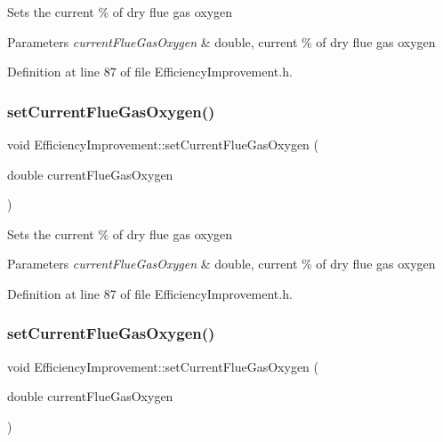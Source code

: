 Sets the current \% of dry flue gas oxygen


\begin{DoxyParams}{Parameters}
{\em current\+Flue\+Gas\+Oxygen} & double, current \% of dry flue gas oxygen \\
\hline
\end{DoxyParams}


Definition at line 87 of file Efficiency\+Improvement.\+h.

\mbox{\label{class_efficiency_improvement_a038c378d51a5baf96521012a572bb106}} 
\subsubsection{\texorpdfstring{set\+Current\+Flue\+Gas\+Oxygen()}{setCurrentFlueGasOxygen()}\hspace{0.1cm}{\footnotesize\ttfamily [2/3]}}
{\footnotesize\ttfamily void Efficiency\+Improvement\+::set\+Current\+Flue\+Gas\+Oxygen (\begin{DoxyParamCaption}\item[{double}]{current\+Flue\+Gas\+Oxygen }\end{DoxyParamCaption})\hspace{0.3cm}{\ttfamily [inline]}}

Sets the current \% of dry flue gas oxygen


\begin{DoxyParams}{Parameters}
{\em current\+Flue\+Gas\+Oxygen} & double, current \% of dry flue gas oxygen \\
\hline
\end{DoxyParams}


Definition at line 87 of file Efficiency\+Improvement.\+h.

\mbox{\label{class_efficiency_improvement_a038c378d51a5baf96521012a572bb106}} 
\subsubsection{\texorpdfstring{set\+Current\+Flue\+Gas\+Oxygen()}{setCurrentFlueGasOxygen()}\hspace{0.1cm}{\footnotesize\ttfamily [3/3]}}
{\footnotesize\ttfamily void Efficiency\+Improvement\+::set\+Current\+Flue\+Gas\+Oxygen (\begin{DoxyParamCaption}\item[{double}]{current\+Flue\+Gas\+Oxygen }\end{DoxyParamCaption})\hspace{0.3cm}{\ttfamily [inline]}}

